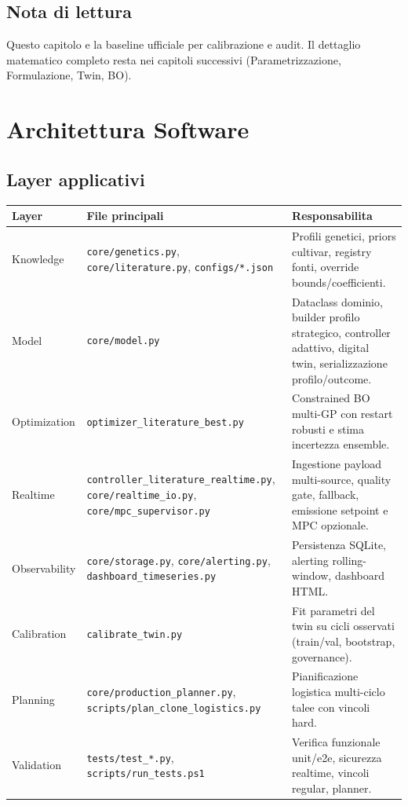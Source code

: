 ﻿\documentclass[11pt,a4paper]{report}
\begin{document}
\section{Nota di lettura}
Questo capitolo e la baseline ufficiale per calibrazione e audit.
Il dettaglio matematico completo resta nei capitoli successivi (Parametrizzazione, Formulazione, Twin, BO).

\newpage
\chapter{Architettura Software}

\section{Layer applicativi}
\begin{longtable}{@{}p{2.8cm}p{5.0cm}p{7.2cm}@{}}
\toprule
Layer & File principali & Responsabilita \\ \midrule
Knowledge & \texttt{core/genetics.py}, \texttt{core/literature.py}, \texttt{configs/*.json} & Profili genetici, priors cultivar, registry fonti, override bounds/coefficienti. \\
Model & \texttt{core/model.py} & Dataclass dominio, builder profilo strategico, controller adattivo, digital twin, serializzazione profilo/outcome. \\
Optimization & \texttt{optimizer\_literature\_best.py} & Constrained BO multi-GP con restart robusti e stima incertezza ensemble. \\
Realtime & \texttt{controller\_literature\_realtime.py}, \texttt{core/realtime\_io.py}, \texttt{core/mpc\_supervisor.py} & Ingestione payload multi-source, quality gate, fallback, emissione setpoint e MPC opzionale. \\
Observability & \texttt{core/storage.py}, \texttt{core/alerting.py}, \texttt{dashboard\_timeseries.py} & Persistenza SQLite, alerting rolling-window, dashboard HTML. \\
Calibration & \texttt{calibrate\_twin.py} & Fit parametri del twin su cicli osservati (train/val, bootstrap, governance). \\
Planning & \texttt{core/production\_planner.py}, \texttt{scripts/plan\_clone\_logistics.py} & Pianificazione logistica multi-ciclo talee con vincoli hard. \\
Validation & \texttt{tests/test\_*.py}, \texttt{scripts/run\_tests.ps1} & Verifica funzionale unit/e2e, sicurezza realtime, vincoli regular, planner. \\
\bottomrule
\end{longtable}
\end{document}
